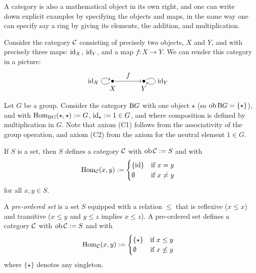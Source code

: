 A category is also a mathematical object in its own right, and one can write down explicit examples by specifying the objects and maps, in the same way one can specify say a ring by giving its elements, the addition, and multiplication. 

\begin{example}\label{exa:one-arrow}
Consider the category ${\mathcal{C}}$ consisting of precisely two objects, $X$ and $Y$, and with precisely three maps: ${\rm id}_X$, ${\rm id}_Y$, and a map $f\colon X\to Y$. We can render this category in a picture:
\[
\begin{tikzpicture}
 \node (X) [label=below:{$X$}] at (-.8,0) {};
 \fill (X) circle[radius=2pt];
 \node (Y) [label=below:{$Y$}] at (.8,0) {};
 \fill (Y) circle[radius=2pt];
  \path (X) edge [loop left, out=-150,in=150,min distance=7mm, ->] node {$\id_X$} (X);
  \path (X) edge [->] node[above] {$f$} (Y);
  \path (Y) edge  [loop right, out=30,in=-30,min distance=7mm, ->] node {$\id_Y$} (Y);
\end{tikzpicture}
\]
\end{example}

\begin{example} \label{exa:BG}
Let $G$ be a group. Consider the category ${\mathrm B} G$ with one object
$\star$ (so $\operatorname{ob}{\mathrm B} G = \{ \star\}$), and with $\operatorname{Hom}_{{\mathrm B} G}(\star,\star) := G$, ${\rm id}_\star := 1 \in G$, and where composition is defined by multiplication in $G$. Note that axiom (C1) follows from the associativity of the group operation, and axiom (C2) from the axiom for the neutral element $1\in G$.
\end{example}

\begin{example}\label{exa:discrete-cat}
If $S$ is a set, then $S$ defines a category ${\mathcal{C}}$ with $\operatorname{ob} {\mathcal{C}} := S$ and with
\[
	\operatorname{Hom}_{\mathcal{C}}(x,y) := \begin{cases}  \{ {\rm id} \} & \text{if $x=y$} \\ \emptyset &\text{if $x\neq y$} \end{cases}
\]
for all $x,y\in S$.
\end{example}

\begin{example}\label{exa:pre-ordered}
A \emph{pre-ordered set} is a set $S$ equipped with a relation $\leq$ that is reflexive ($x\leq x$)  and transitive ($x\leq y$ and $y\leq z$ implies $x\leq z$). A pre-ordered set defines a category ${\mathcal{C}}$ with $\operatorname{ob} {\mathcal{C}} := S$ and with
\[
	\operatorname{Hom}_{\mathcal{C}}(x,y) := \begin{cases}  \{  \star \} & \text{if $x\leq y$} \\ \emptyset &\text{if $x\not\leq y$} \end{cases}
\]
where $\{\star\}$ denotes any singleton. 
\end{example}

